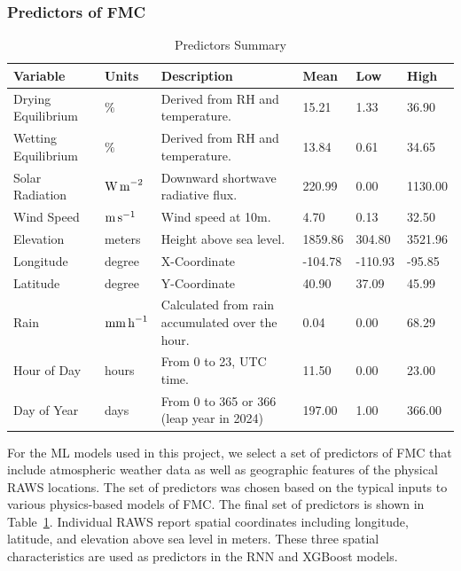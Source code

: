 \documentclass[fire,article,submit,pdftex,moreauthors]{Definitions/mdpi}
\begin{document}
\subsubsection{Predictors of FMC}
\label{sec:preds}
\begin{table}[tb]
\caption{Predictors Summary\label{tab:all_vars}}
\small
\begin{tabularx}{\textwidth}{l l p{4cm} p{1cm} p{1cm} p{1cm}}
\toprule
\textbf{Variable} & \textbf{Units} & \textbf{Description} & \textbf{Mean} & \textbf{Low} & \textbf{High} \\
\midrule
Drying Equilibrium & $\%$ & Derived from RH and temperature. & 15.21 & 1.33 & 36.90 \\
\midrule
Wetting Equilibrium & $\%$ & Derived from RH and temperature. & 13.84 & 0.61 & 34.65 \\
\midrule
Solar Radiation & $\text{W\,m}^{-2}$ & Downward shortwave radiative flux. & 220.99 & 0.00 & 1130.00 \\
\midrule
Wind Speed & $\text{m\,s}^{-1}$ & Wind speed at 10m. & 4.70 & 0.13 & 32.50 \\
\midrule
Elevation & meters & Height above sea level. & 1859.86 & 304.80 & 3521.96 \\
\midrule
Longitude & degree & X-Coordinate & -104.78 & -110.93 & -95.85 \\
\midrule
Latitude & degree & Y-Coordinate & 40.90 & 37.09 & 45.99 \\
\midrule
Rain & $\text{mm\,h}^{-1}$ & Calculated from rain accumulated over the hour. & 0.04 & 0.00 & 68.29 \\
\midrule
Hour of Day & hours & From 0 to 23, UTC time. & 11.50 & 0.00 & 23.00 \\
\midrule
Day of Year & days & From 0 to 365 or 366 (leap year in 2024) & 197.00 & 1.00 & 366.00 \\
\bottomrule
\end{tabularx}
\end{table}

For the ML models used in this project, we select a set of predictors of FMC that include atmospheric weather data as well as geographic features of the physical RAWS locations. The set of predictors was chosen based on the typical inputs to various physics-based models of FMC. The final set of predictors is shown in Table~\ref{tab:all_vars}. Individual RAWS report spatial coordinates including longitude, latitude, and elevation above sea level in meters. These three spatial characteristics are used as predictors in the RNN and XGBoost models. 
\end{document}
